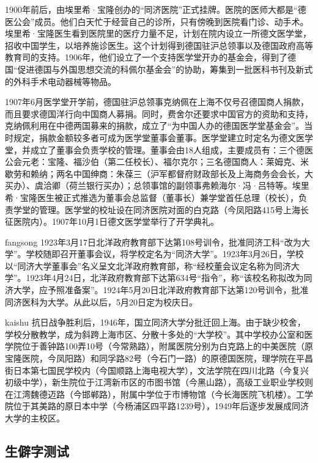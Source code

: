 {\songti

1900年前后，由埃里希·宝隆创办的“同济医院”正式挂牌。医院的医师大都是“德医公会”成员。他们白天忙于经营自己的诊所，只有傍晚到医院看门诊、动手术。埃里希·宝隆医生看到医院里的医疗力量不足，计划在院内设立一所德文医学堂，招收中国学生，以培养施诊医生。这个计划得到德国驻沪总领事以及德国政府高等教育司的支持。1906年，他们设立了一个支持医学堂开办的基金会，得到了德国“促进德国与外国思想交流的科佩尔基金会”的协助，筹集到一批医科书刊及新式的外科手术电动器械等物品。}

{\heiti 1907年6月医学堂开学前，德国驻沪总领事克纳佩在上海不仅号召德国商人捐款，而且要求德国洋行向中国商人募捐。同时，费舍尔还要求中国官方的资助和支持，克纳佩利用在中德两国募来的捐款，成立了“为中国人办的德国医学堂基金会”。当时规定，捐款金额较多者可成为医学堂董事会董事。医学堂建立时定名为德文医学堂，并成立了董事会负责学校的管理。董事会由18人组成，主要成员有：三个德医公会元老：宝隆、福沙伯（第二任校长）、福尔克尔；三名德国商人：莱姆克、米歇劳和赖纳；两名中国绅商：朱葆三（沪军都督府财政部长及上海商务会会长，大买办）、虞洽卿（荷兰银行买办）；总领事馆的副领事弗赖海尔·冯·吕特等。埃里希·宝隆医生被正式推选为董事会总监督（董事长）兼学堂首任总理（校长），负责学堂的管理。医学堂的校址设在同济医院对面的白克路（今凤阳路415号上海长征医院内）。1907年10月1日德文医学堂举行了开学典礼。}

{\ifcsname fangsong\endcsname\fangsong\else[无 \cs{fangsong} 字体。]\fi
1923年3月17日北洋政府教育部下达第108号训令，批准同济工科“改为大学”。学校随即召开董事会议，将学校定名为“同济大学”。1923年3月26日，学校以“同济大学董事会”名义呈文北洋政府教育部，称“经校董会议定名称为同济大学”。1923年4月24日，北洋政府教育部下达第634号“指令”，称“该校名称拟改为同济大学，应予照准备案”。1924年5月20日北洋政府教育部下达第120号训令，批准同济医科为大学。从此以后，5月20日定为校庆日。}

{\ifcsname kaishu\endcsname\kaishu\else[无 \cs{kaishu} 字体。]\fi
抗日战争胜利后，1946年，国立同济大学分批迁回上海。由于缺少校舍，学校分散教学，成为斜跨上海市区、分散十多处的“大学校”。其中学校办公室和医学院位于善钟路100弄10号（今常熟路），附属医院分别为白克路上的中美医院（原宝隆医院，今凤阳路）和同孚路82号（今石门一路）的原德国医院，理学院在平昌街日本第七国民学校内（今国顺路上海电视大学），文法学院在四川北路（今复兴初级中学），新生院位于江湾新市区的市图书馆（今黑山路），高级工业职业学校则在江湾魏德迈路（今邯郸路），附属中学位于市博物馆（今长海医院飞机楼）。工学院位于其美路的原日本中学（今杨浦区四平路1239号），1949年后逐步发展成同济大学的主校区。}

\subsection{生僻字测试}\label{sec:uncommon}

